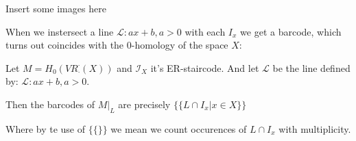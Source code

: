 {\color{red} Insert some images here}

When we instersect a line $\mathcal{L}:{ax+b,a>0}$ with each $I_x$ we get a 
barcode, which turns out coincides with the $0$-homology of the space $X$:

\begin{theorem}\cite{cai2020}
    Let $M=H_0(VR_\cdot^\cdot(X))$ 
    and $\mathcal{I}_X$ it's ER-staircode.
    And let $\mathcal{L}$ be the line defined by:
    $\mathcal{L}:{ax+b,a>0}$.

    Then the barcodes of $M\vert_L$ are precisely $\{\{
        L\cap I_x\vert x\in X
    \}\}$

    Where by te use of $\{\{\}\}$ we mean we count occurences of $L\cap I_x$ with multiplicity.
\end{theorem}

